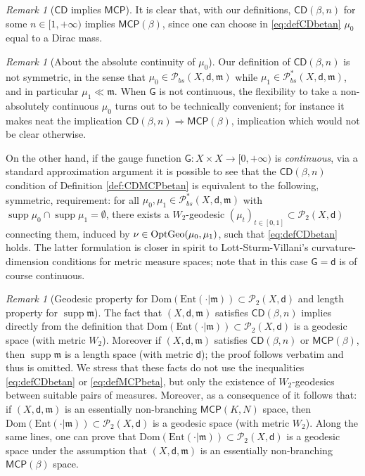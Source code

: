 \documentclass[11pt,a4paper]{article}
\theoremstyle{plain}
\theoremstyle{definition}
\theoremstyle{remark}
\newtheorem{remark}[theorem]{Remark}
\numberwithin{equation}{section}
\DeclareMathOperator{\supp}{\mathrm{supp}}
\newcommand{\CD}{\mathsf{CD}}
\newcommand{\MCP}{\mathsf{MCP}}
\newcommand{\OptGeo}{{\rm OptGeo}}
\newcommand{\Ent}{\mathrm{Ent}}
\newcommand{\Dom}{\mathrm{Dom}}
\newcommand{\Prob}{\mathcal{P}}
\newcommand{\mm}{\mathfrak m}
\newcommand{\sfd}{\mathsf d}
\newcommand{\sfG}{\mathsf G}
\begin{document}
\begin{remark}[$\CD$ implies $\MCP$]\label{rem:CDimpliesMCP}
It is clear that, with our definitions, $\CD(\beta,n)$ for some $n \in [1,+\infty)$ implies $\MCP(\beta)$, since one can choose in \eqref{eq:defCDbetan} $\mu_0$ equal to a Dirac mass.
\end{remark}

\begin{remark}[About the absolute continuity of $\mu_0$]\label{rem:mu0Pbs}
Our definition of $\CD(\beta,n)$ is not symmetric, in the sense that $\mu_0 \in \Prob_{bs}(X,\sfd,\mm)$ while $\mu_1 \in \Prob_{bs}^*(X,\sfd,\mm)$, and in particular $\mu_1\ll \mm$. When $\sfG$ is not continuous, the flexibility  to take a non-absolutely continuous $\mu_0$ turns out to be technically convenient; for instance it makes neat the implication $\CD(\beta,n)\Rightarrow \MCP(\beta)$, implication which would not be clear otherwise.

On the other hand, if the gauge function $\sfG:X\times X \to [0,+\infty)$ is \emph{continuous}, via a standard approximation argument it is possible to see that the $\CD(\beta,n)$ condition of Definition \ref{def:CDMCPbetan} is equivalent to the following, symmetric, requirement: 
 for all  $\mu_0, \mu_1\in \Prob_{bs}^{*}(X,\sfd,\mm)$  with $\supp \mu_0\cap \supp \mu_1 =\emptyset$,  there exists a $W_2$-geodesic $(\mu_t)_{t\in[0,1]} \subset \Prob_2(X,\sfd)$ connecting them, induced by $\nu\in \OptGeo(\mu_0,\mu_1)$, such that \eqref{eq:defCDbetan} holds.
 The latter formulation is closer in spirit to   Lott-Sturm-Villani's  curvature-dimension conditions for metric measure spaces; note that in this case $\sfG=\sfd$ is of course continuous.
\end{remark}


\begin{remark}[Geodesic property for $\Dom(\Ent(\cdot | \mm))\subset \Prob_{2}(X,\sfd)$ and length property for  $\supp \mm$]\label{rem:LengthSpace}
The fact that $(X,\sfd,\mm)$ satisfies $\CD(\beta, n)$ implies directly from the definition that $\Dom(\Ent(\cdot | \mm))\subset \Prob_{2}(X,\sfd)$ is a geodesic space (with metric $W_{2}$). Moreover if $(X,\sfd,\mm)$ satisfies $\CD(\beta, n)$ or $\MCP(\beta)$, then $\supp \mm$ is a length space (with metric $\sfd$); the proof follows verbatim  \cite[Remark 4.6, (iii)]{sturm:I} and thus is omitted.   We stress that these facts do not use the inequalities \eqref{eq:defCDbetan} or \eqref{eq:defMCPbeta}, but only the existence of $W_2$-geodesics between suitable pairs of measures. Moreover, as a consequence of \cite[Thm.\@ 1.1]{CavaMondCCM} it follows that: if $(X,\sfd, \mm)$ is an essentially non-branching $\MCP(K,N)$ space, then  $\Dom(\Ent(\cdot | \mm))\subset \Prob_{2}(X,\sfd)$ is a geodesic space (with metric $W_{2}$). Along the same lines, one can prove that $\Dom(\Ent(\cdot | \mm))\subset \Prob_{2}(X,\sfd)$ is a geodesic  space under the assumption that  $(X,\sfd, \mm)$ is an essentially non-branching $\MCP(\beta)$ space.
\end{remark}
\end{document}
